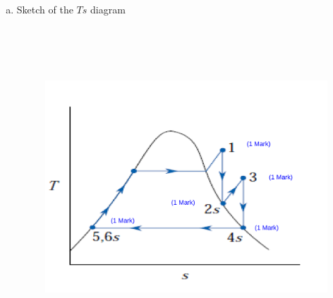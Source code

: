 \documentclass[12pt,twoside]{report}
\newcommand{\frc}{\displaystyle\frac}
\begin{document}
\begin{description}
\begin{enumerate}[(a)]
Before determine $\eta_{\text{thermal}}$, the following should have been calculated,
\begin{eqnarray}
&& \textcolor{red}{H_{2s}=2740.73\frc{kJ}{kg}} \;\;\textcolor{blue}{(1 \; Mark)} \;\;\;\;\;\; \textcolor{red}{H_{2}=2804.76\frc{kJ}{kg}}   \;\;\textcolor{blue}{(1 \; Mark)} \nonumber\\
&& \textcolor{red}{H_{4s}=2389.35\frc{kJ}{kg}} \;\;\textcolor{blue}{(1 \; Mark)} \;\;\;\;\;\; \textcolor{red}{V_{5}=0.00101\frc{m^{3}}{kg}} \;\;\textcolor{blue}{(1 \; Mark)} \nonumber 
\end{eqnarray}

Now calculating $\eta_{\text{Thermal}}$,
\begin{eqnarray}
\textcolor{red}{\eta_{Thermal}}&=&\frc{\left(3140.94-2740.73\right)0.84 + \left(3205.7-2389.35\right)0.80 - \frc{0.00101\left(40-0.10\right)10^{5}10^{-3}}{0.61}}{\left(3140.94-198.41\right)+\left(3205.7-2804.76\right)} \nonumber\\
&=& \textcolor{red}{0.2939}\;\;\;\textcolor{blue}{(1\; Mark)} \nonumber 
\end{eqnarray}



\item Sketch of the $Ts$ diagram
\begin{figure}[h]
\begin{center}
\includegraphics[width=12.cm,height=12cm,clip]{./Pics/Exam_Reheat_Rankine_Cycle3}
\end{center}
\end{figure}


\end{enumerate}
\end{description}
\end{document}
